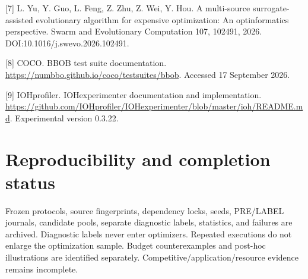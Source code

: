 \documentclass[11pt,a4paper]{article}
\begin{document}
{[}7{]} L. Yu, Y. Guo, L. Feng, Z. Zhu, Z. Wei, Y. Hou. A multi-source
surrogate-assisted evolutionary algorithm for expensive optimization: An
optinformatics perspective. Swarm and Evolutionary Computation 107,
102491, 2026. DOI:10.1016/j.swevo.2026.102491.

{[}8{]} COCO. BBOB test suite documentation.
\url{https://numbbo.github.io/coco/testsuites/bbob}. Accessed 17
September 2026.

{[}9{]} IOHprofiler. IOHexperimenter documentation and implementation.
\url{https://github.com/IOHprofiler/IOHexperimenter/blob/master/ioh/README.md}.
Experimental version 0.3.22.

\hypertarget{reproducibility-and-completion-status}{%
\section{Reproducibility and completion
status}\label{reproducibility-and-completion-status}}

Frozen protocols, source fingerprints, dependency locks, seeds,
PRE/LABEL journals, candidate pools, separate diagnostic labels,
statistics, and failures are archived. Diagnostic labels never enter
optimizers. Repeated executions do not enlarge the optimization sample.
Budget counterexamples and post-hoc illustrations are identified
separately. Competitive/application/resource evidence remains
incomplete.
\end{document}
